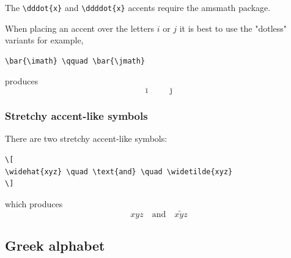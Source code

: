 \documentclass[a4paper,14pt]{extarticle}
\begin{document}
The \verb=\dddot{x}= and \verb=\ddddot{x}= accents require the amsmath package. 

When placing an accent over the letters \(i\) or \(j\) it is best to use  the "dotless" variants for example,
\begin{verbatim}
\bar{\imath} \qquad \bar{\jmath}
\end{verbatim}
produces
\[
\bar{\imath} \qquad \bar{\jmath}
\]

\subsubsection{Stretchy accent-like symbols}

There are two stretchy accent-like symbols:
\begin{verbatim}
\[
\widehat{xyz} \quad \text{and} \quad \widetilde{xyz}
\]
\end{verbatim}
which produces
\[
\widehat{xyz} \quad \text{and} \quad \widetilde{xyz}
\]

\subsection{Greek alphabet}
\end{document}
